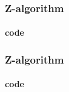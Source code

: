 \begin{frame}[fragile]
    \frametitle{Z-algorithm}
    \framesubtitle{code}

    
\end{frame}

\begin{frame}[fragile]
   \frametitle{Z-algorithm}
   \framesubtitle{code}

   
\end{frame}
